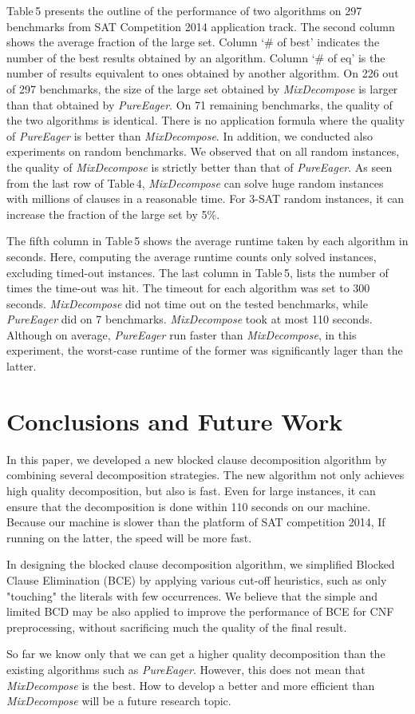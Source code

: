 \documentclass{llncs}
\begin{document}
Table\,5 presents the outline of the performance of two algorithms
on 297 benchmarks from SAT Competition 2014 application track. The
second column shows the average fraction of the large set. Column
`\# of best' indicates the number of the best results obtained by an
algorithm. Column `\# of eq' is the number of results equivalent to
ones obtained by another algorithm. On 226 out of 297 benchmarks,
the size of the large set obtained by \emph{MixDecompose} is larger
than that obtained by \emph{PureEager}. On 71 remaining benchmarks,
the quality of the two algorithms is identical. There is no
application formula where the quality of \emph{PureEager} is better
than \emph{MixDecompose}. In addition, we conducted also experiments
on random benchmarks. We observed that on all random instances, the
quality of \emph{MixDecompose} is strictly better than that of
\emph{PureEager}. As seen from the last row of Table\,4, \emph{
MixDecompose} can solve huge random instances with millions of
clauses in a reasonable time. For 3-SAT random instances, it can
increase the fraction of the large set by 5\%.

 The fifth column in Table\,5 shows the average runtime taken by each algorithm
 in seconds. Here, computing the average runtime counts only solved instances,
 excluding timed-out instances. The last column in Table\,5, lists the number of times the time-out was hit.
 The timeout for each algorithm was set to 300 seconds. \emph{MixDecompose} did
 not time out on the tested benchmarks, while \emph{PureEager} did
 on 7 benchmarks. \emph{MixDecompose} took at most 110 seconds. Although on average, \emph{PureEager} run faster than
 \emph{MixDecompose}, in this experiment, the worst-case runtime of the former was significantly lager than
 the latter.


\section {Conclusions and Future Work}

  In this paper, we developed a new blocked clause decomposition
algorithm by combining several decomposition strategies. The new
algorithm not only achieves high quality decomposition, but also is
fast. Even for large instances, it can ensure that the decomposition
is done within 110 seconds on our machine. Because our machine is
slower than the platform of SAT competition 2014, If running on the
latter, the speed will be more fast.

 In designing the blocked clause decomposition
algorithm, we simplified Blocked Clause Elimination (BCE) by
applying various cut-off heuristics, such as only "touching" the
literals with few occurrences. We believe that the simple and
limited BCD may be also applied to improve the performance of BCE
for CNF preprocessing, without sacrificing much the quality of the
final result.

   So far we know only that we can get a higher quality decomposition
than the existing algorithms such as \emph{PureEager}. However, this
 does not mean that \emph{MixDecompose} is the best.  How to develop a better
and more efficient than \emph{MixDecompose} will be a future
research topic.



\end{document}

